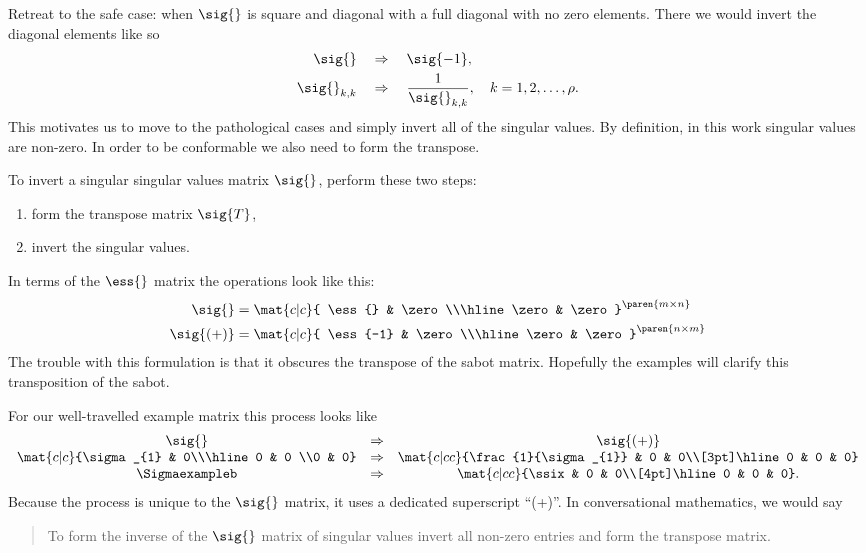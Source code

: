 Retreat to the safe case: when $\sig{}$ is square and diagonal with a full diagonal with no zero elements. There we would invert the diagonal elements like so
\begin{equation}
  \begin{split}
   \sig{}       & \quad \Rightarrow \quad \sig{-1},\\    
   \sig{}_{k,k} & \quad \Rightarrow \quad \frac{1}{\sig{}_{k,k}}, \quad k=1,2,\dots,\rho.    
  \end{split}
\end{equation}This motivates us to move to the pathological cases and simply invert all of the singular values. By definition, in this work singular values are non-zero. In order to be conformable we also need to form the transpose.

To invert a singular singular values matrix $\sig{}$, perform these two steps:
\begin{enumerate}
\item form the transpose matrix $\sig{T}$,
\item invert the singular values.
\end{enumerate}
In terms of the $\ess{}$ matrix the operations look like this:
\begin{equation}
  \begin{split}
    \sig{} &= \mat{c|c}
    {
    \ess{} & \zero \\\hline
    \zero & \zero
    }^{\paren{m\times n}} \\
    \sig{(+)} &= \mat{c|c}
    {
    \ess{-1} & \zero \\\hline
    \zero & \zero
    }^{\paren{n\times m}}
  \end{split}
\end{equation}
The trouble with this formulation is that it obscures the transpose of the sabot matrix.  Hopefully the examples will clarify this transposition of the sabot.

For our well-travelled example matrix this process looks like
\begin{equation}
\begin{array}{ccc}
\sig{} &\Rightarrow& \sig{(+)} \\
 \mat{c|c}{\sigma_{1} & 0\\\hline0 & 0 \\0 & 0} & \Rightarrow & \mat{c|cc}{\frac{1}{\sigma_{1}} & 0 & 0\\[3pt]\hline0 & 0 & 0} \\
\Sigmaexampleb  & \Rightarrow & \mat{c|cc}{\ssix & 0 & 0\\[4pt]\hline0 & 0 & 0}.
\end{array}
\end{equation}
Because the process is unique to the $\sig{}$ matrix, it uses a dedicated superscript ``(+)''. In conversational mathematics, we would say
\begin{quote}
  To form the inverse of the $\sig{}$ matrix of singular values invert all non-zero entries and form the transpose matrix.
\end{quote}

